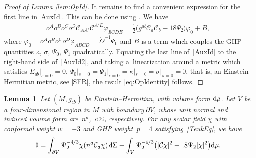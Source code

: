 \documentclass[pdftex]{sigma}
\numberwithin{equation}{section}
\newtheorem{Lemma}[Theorem]{Lemma}
\begin{document}
\begin{proof}[Proof of Lemma \ref{lem:OpId}]
It remains to find a convenient expression for the first line in \eqref{AuxId}. This can be done using \cite[equations~(3.6) and (3.15)]{araneda2018conformal}. We have
\begin{align}\label{AuxId2}
o^Ao^Bo^Co^D\mathcal{C}_{AA'}\mathcal{C}^{A'E}\varphi_{BCDE} =
\frac{1}{2} \bigl(g^{ab}\mathcal{C}_{a}\mathcal{C}_{b}-18\Psi_{2}\bigr)\varphi_{0} + B,
\end{align}
where $\varphi_{0}= o^Ao^Bo^Co^D\varphi_{ABCD}=\mathring{\Omega}^{-1}\Psi_0$ and $B$ is a term which couples the GHP quantities $\kappa$, $\sigma$, $\Psi_0$, $\Psi_1$ quadratically. Equating the last line of~\eqref{AuxId} to the right-hand side of~\eqref{AuxId2}, and taking a~linearization around a metric which satisfies $E_{ab}|_{s=0}=0$, ${\Psi_{0}|_{s=0}=\Psi_{1}|_{s=0}=\kappa|_{s=0}=\sigma|_{s=0}=0}$, that is, an Einstein--Hermitian metric, see \eqref{SFR}, the result \eqref{eq:OpIdentity} follows.
\end{proof}

\begin{Lemma}\label{lem:divergence}
Let $(M, g_{ab})$ be Einstein--Hermitian, with volume form ${\rm d}\mu$.
Let $V$ be a four-dimen\-sion\-al region in $M$ with boundary $\partial{V}$, whose unit normal and induced volume form are~$n^{a}$,~${\rm d}\Sigma$, respectively. For any scalar field $\chi$ with conformal weight $w=-3$ and GHP weight~${p=4}$ satisfying~\eqref{TeukEq}, we have
\begin{align} \label{eq:MainIdentity}
0 =
\int_{\partial{V}} \Psi_{2}^{-4/3}\bar\chi(n^a\mathcal{C}_{a}\chi) \, {\rm d}\Sigma
- \int_{V}\Psi_{2}^{-4/3}\bigl(|\mathcal{C}\chi|^{2} + 18\Psi_{2}|\chi|^2\bigr){\rm d}\mu.
\end{align}
\end{Lemma}
\end{document}
